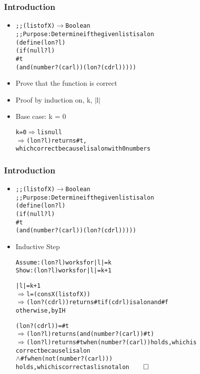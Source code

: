 \documentclass{beamer}
\newcommand{\arrow}{\(\rightarrow\)}
\newcommand{\logand}{\texttt{\(\wedge\)}}
\newcommand{\imp}{\texttt{\(\Rightarrow\)}}
\begin{document}
\begin{frame}[fragile]
\frametitle{Introduction}
\begin{scriptsize}
\begin{itemize}
\item<1->
\begin{alltt}
;; (listof X) \arrow Boolean
;; Purpose: Determine if the given list is a lon
(define (lon? l)
  (if (null? l)
      #t
      (and (number? (car l)) (lon? (cdr l)))))
\end{alltt}

\item<2-> Prove that the function is correct

\item<3-> Proof by induction on, k, $|$l$|$

\item<4-> Base case: k = 0
\begin{alltt}
k = 0 \imp{} l is null
      \imp{} (lon? l) returns #t,
         which correct because l is a lon with 0 numbers
\end{alltt}

\end{itemize}
\end{scriptsize}
\end{frame}

\begin{frame}[fragile]
\frametitle{Introduction}
\begin{scriptsize}
\begin{itemize}
\item<1->
\begin{alltt}
;; (listof X) \arrow Boolean
;; Purpose: Determine if the given list is a lon
(define (lon? l)
  (if (null? l)
      #t
      (and (number? (car l)) (lon? (cdr l)))))
\end{alltt}

\item<1-> Inductive Step
\begin{alltt}
Assume: (lon? l) works for |l|=k
  Show: (lon? l) works for |l|=k+1

|l|=k+1
  \imp{} l = (cons X (listof X))
  \imp{} (lon? (cdr l)) returns #t if (cdr l) is a lon and #f
                            otherwise, by IH

(lon? (cdr l)) = #t
  \imp{} (lon? l) returns (and (number? (car l)) #t)
  \imp{} (lon? l) returns #t when (number? (car l)) holds, which is
                      correct because l is a lon
                    \logand{} #f when (not (number? (car l)))
                      holds, which is correct as l is not a lon\(\qed\)
\end{alltt}

\end{itemize}
\end{scriptsize}
\end{frame}
\end{document}
